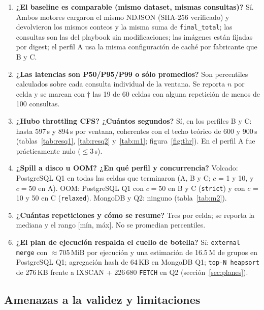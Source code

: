 \documentclass[11pt,a4paper]{article}
\begin{document}
\begin{enumerate}[label=\textbf{\arabic*.}]
  \item \textbf{¿El baseline es comparable (mismo dataset, mismas consultas)?} Sí. Ambos motores cargaron el mismo NDJSON (SHA-256 verificado) y devolvieron los mismos conteos y la misma suma de \texttt{final\_total}; las consultas son las del playbook sin modificaciones; las imágenes están fijadas por digest; el perfil A usa la misma configuración de caché por fabricante que B y C.
  \item \textbf{¿Las latencias son P50/P95/P99 o sólo promedios?} Son percentiles calculados sobre cada consulta individual de la ventana. Se reporta $n$ por celda y se marcan con $\dagger$ las 19 de 60 celdas con alguna repetición de menos de 100 consultas.
  \item \textbf{¿Hubo throttling CFS? ¿Cuántos segundos?} Sí, en los perfiles B y C: hasta 597\,s y 894\,s por ventana, coherentes con el techo teórico de 600 y 900\,s (tablas~\ref{tab:resq1}, \ref{tab:resq2} y~\ref{tab:m1}; figura~\ref{fig:thr}). En el perfil A fue prácticamente nulo ($\leq$3\,s).
  \item \textbf{¿Spill a disco u OOM? ¿En qué perfil y concurrencia?} Volcado: PostgreSQL Q1 en todas las celdas que terminaron (A, B y C; $c$ = 1 y 10, y $c=50$ en A). OOM: PostgreSQL Q1 con $c=50$ en B y C (\texttt{strict}) y con $c$ = 10 y 50 en C (\texttt{relaxed}). MongoDB y Q2: ninguno (tabla~\ref{tab:m2}).
  \item \textbf{¿Cuántas repeticiones y cómo se resume?} Tres por celda; se reporta la mediana y el rango [mín, máx]. No se promedian percentiles.
  \item \textbf{¿El plan de ejecución respalda el cuello de botella?} Sí: \texttt{external merge} con $\approx$705\,MiB por ejecución y una estimación de 16.5\,M de grupos en PostgreSQL Q1; agregación hash de 64\,KB en MongoDB Q1; \texttt{top-N heapsort} de 276\,KB frente a IXSCAN + 226\,680 \texttt{FETCH} en Q2 (sección~\ref{sec:planes}).
\end{enumerate}

\subsection{Amenazas a la validez y limitaciones}\label{sec:amenazas}
\end{document}
